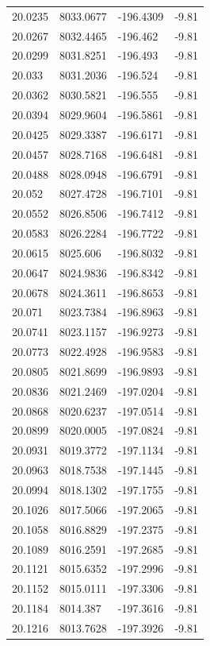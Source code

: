 \begin{table}[H]
\begin{tabular}{llll}
20.0235 & 8033.0677 & -196.4309 & -9.81 \\
20.0267 & 8032.4465 & -196.462 & -9.81 \\
20.0299 & 8031.8251 & -196.493 & -9.81 \\
20.033 & 8031.2036 & -196.524 & -9.81 \\
20.0362 & 8030.5821 & -196.555 & -9.81 \\
20.0394 & 8029.9604 & -196.5861 & -9.81 \\
20.0425 & 8029.3387 & -196.6171 & -9.81 \\
20.0457 & 8028.7168 & -196.6481 & -9.81 \\
20.0488 & 8028.0948 & -196.6791 & -9.81 \\
20.052 & 8027.4728 & -196.7101 & -9.81 \\
20.0552 & 8026.8506 & -196.7412 & -9.81 \\
20.0583 & 8026.2284 & -196.7722 & -9.81 \\
20.0615 & 8025.606 & -196.8032 & -9.81 \\
20.0647 & 8024.9836 & -196.8342 & -9.81 \\
20.0678 & 8024.3611 & -196.8653 & -9.81 \\
20.071 & 8023.7384 & -196.8963 & -9.81 \\
20.0741 & 8023.1157 & -196.9273 & -9.81 \\
20.0773 & 8022.4928 & -196.9583 & -9.81 \\
20.0805 & 8021.8699 & -196.9893 & -9.81 \\
20.0836 & 8021.2469 & -197.0204 & -9.81 \\
20.0868 & 8020.6237 & -197.0514 & -9.81 \\
20.0899 & 8020.0005 & -197.0824 & -9.81 \\
20.0931 & 8019.3772 & -197.1134 & -9.81 \\
20.0963 & 8018.7538 & -197.1445 & -9.81 \\
20.0994 & 8018.1302 & -197.1755 & -9.81 \\
20.1026 & 8017.5066 & -197.2065 & -9.81 \\
20.1058 & 8016.8829 & -197.2375 & -9.81 \\
20.1089 & 8016.2591 & -197.2685 & -9.81 \\
20.1121 & 8015.6352 & -197.2996 & -9.81 \\
20.1152 & 8015.0111 & -197.3306 & -9.81 \\
20.1184 & 8014.387 & -197.3616 & -9.81 \\
20.1216 & 8013.7628 & -197.3926 & -9.81 \\

\end{tabular}
\end{table}
